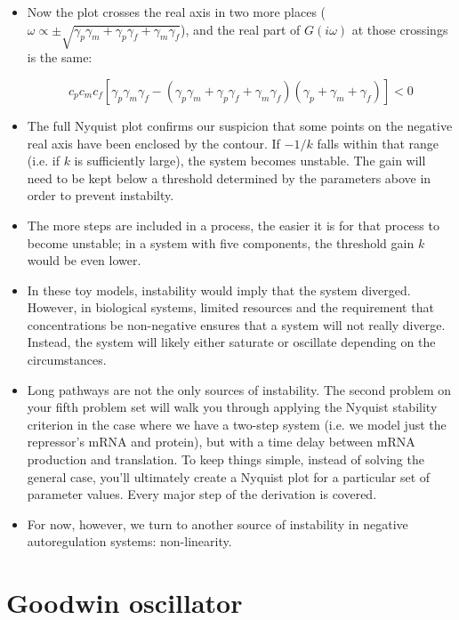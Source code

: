 \documentclass{article}
\begin{document}
\begin{itemize}
\item Now the plot crosses the real axis in two more places ($\omega \propto \pm \sqrt{ \gamma_p \gamma_m + \gamma_p \gamma_f + \gamma_m \gamma_f}$), and the real part of $G(i\omega)$ at those crossings is the same:

\[ c_p c_m c_f \left[ \gamma_p \gamma_m \gamma_f - \left( \gamma_p \gamma_m + \gamma_p \gamma_f + \gamma_m \gamma_f \right) \left(\gamma_p + \gamma_m + \gamma_f \right) \right] < 0  \]

\item The full Nyquist plot confirms our suspicion that some points on the negative real axis have been enclosed by the contour. If $-1/k$ falls within that range (i.e. if $k$ is sufficiently large),  the system becomes unstable. The gain will need to be kept below a threshold determined by the parameters above in order to prevent instabilty.

\item The more steps are included in a process, the easier it is for that process to become unstable; in a system with five components, the threshold gain $k$ would be even lower.

\item In these toy models, instability would imply that the system diverged. However, in biological systems, limited resources and the requirement that concentrations be non-negative ensures that a system will not really diverge. Instead, the system will likely either saturate or oscillate depending on the circumstances.

\item Long pathways are not the only sources of instability. The second problem on your fifth problem set will walk you through applying the Nyquist stability criterion in the case where we have a two-step system (i.e. we model just the repressor's mRNA and protein), but with a time delay between mRNA production and translation. To keep things simple, instead of solving the general case, you'll ultimately create a Nyquist plot for a particular set of parameter values. Every major step of the derivation is covered.

\item For now, however, we turn to another source of instability in negative autoregulation systems: non-linearity.
\end{itemize}

\section*{Goodwin oscillator}
\end{document}
